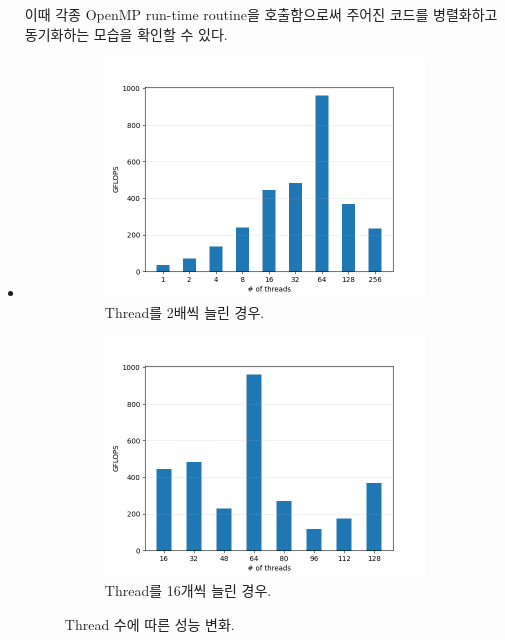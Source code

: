 \begin{itemize}
{        이때 각종 OpenMP run-time routine을 호출함으로써 주어진 코드를 병렬화하고 동기화하는 모습을
        확인할 수 있다\cite{chapman2015openmp}.
    }
    \item {
        \begin{figure}[t]
            \centering
            \begin{subfigure}[b]{0.49\textwidth}
                \centering
                \includegraphics[width=\textwidth]{imgs/gflops_exp.png}
                \caption{Thread를 2배씩 늘린 경우.}\label{fig:gflops_exp}
            \end{subfigure}
            \hfill
            \begin{subfigure}[b]{0.49\textwidth}
                \centering
                \includegraphics[width=\textwidth]{imgs/gflops_lin.png}
                \caption{Thread를 16개씩 늘린 경우.}\label{fig:gflops_lin}
            \end{subfigure}
            \caption{Thread 수에 따른 성능 변화.}\label{fig:gflops}
        \end{figure}
        
}
\end{itemize}
